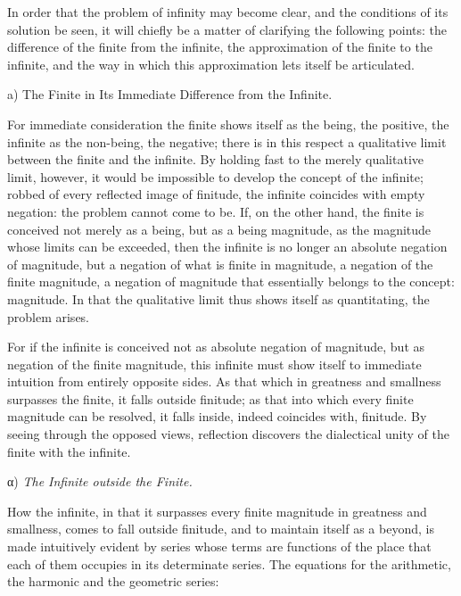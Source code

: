 \documentclass[12pt,a4paper,openany]{book}
\newcommand{\opage}[1]{\marginnote{\footnotesize\textit{[#1]}}}
\begin{document}
In order that the problem of infinity may become clear, and
the conditions of its solution be seen, it will chiefly
be a matter of clarifying the following points: the difference of the
finite from the infinite, the approximation of the finite to the
infinite, and the way in which this approximation
lets itself be articulated.

\begin{center}a) The Finite in Its Immediate Difference from the Infinite.\end{center}

For immediate consideration the finite shows itself
as the being, the positive, the infinite as the non-being,
the negative; there is in this respect a qualitative
limit between the finite and the infinite. By holding fast
to the merely qualitative limit, however, it would
be impossible to develop the concept of the infinite; robbed of
every reflected image of finitude, the infinite coincides
with empty negation: the problem cannot come to be.
If, on the other hand, the finite is conceived not merely as a being,
but as a being magnitude, as the magnitude whose
limits can be exceeded, then the infinite is no
longer an absolute negation of magnitude, but a negation
of what is finite in magnitude, a negation of the
finite magnitude, a negation of magnitude that essentially
belongs to the concept: magnitude. In that the qualitative
limit thus shows itself as quantitating, the
problem arises.

For if the infinite is conceived not as absolute negation of magnitude,
but as negation of the finite magnitude,
\setcounter{footnote}{0}%
\opage{30}this infinite must show itself to immediate intuition
from entirely opposite sides. As that which in greatness and
smallness surpasses the finite, it falls outside finitude;
as that into which every finite magnitude can be
resolved, it falls inside, indeed coincides with, finitude.
By seeing through the opposed views, reflection discovers
the dialectical unity of the finite with the infinite.

\begin{center}α) \emph{The Infinite outside the Finite.}\end{center}

How the infinite, in that it surpasses every finite magnitude in greatness and
smallness, comes to
fall outside finitude, and to maintain itself as a beyond,
is made intuitively evident by series whose terms are functions of the
place that each of them occupies in its determinate series. The equations for
the arithmetic, the harmonic and the geometric series:
\end{document}
